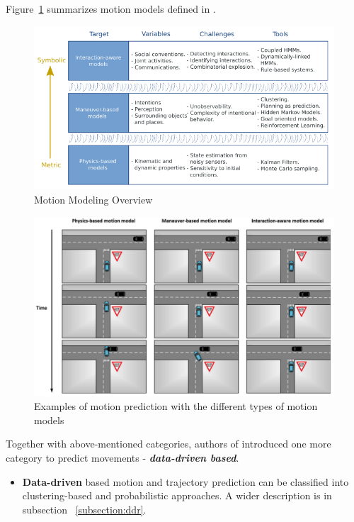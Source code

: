 Figure~\ref{fig:MotModOv} summarizes motion models defined in \cite{ClassificationI}.

\begin{figure}[h]
	\centering  	
	\includegraphics[width=13cm]{img/2.jpg}
	\caption{Motion Modeling Overview \cite{ClassificationI}}
	\label{fig:MotModOv}    
\end{figure}

\begin{figure}[h]
	\centering  	
	\includegraphics[width=13cm]{img/5.jpg}
	\caption{Examples of motion prediction with the different types of motion models \cite{ClassificationI}}
	\label{fig:MotModOv2}    
\end{figure}

Together with above-mentioned categories, authors of \cite{ClassificationII} introduced one more category to predict movements - \textbf{\textit{data-driven based}}.

\begin{itemize}
	\item \textbf{Data-driven} based motion and trajectory prediction can be classified into clustering-based and probabilistic approaches. A wider description is in subsection ~\ref{subsection:ddr}.
\end{itemize}

